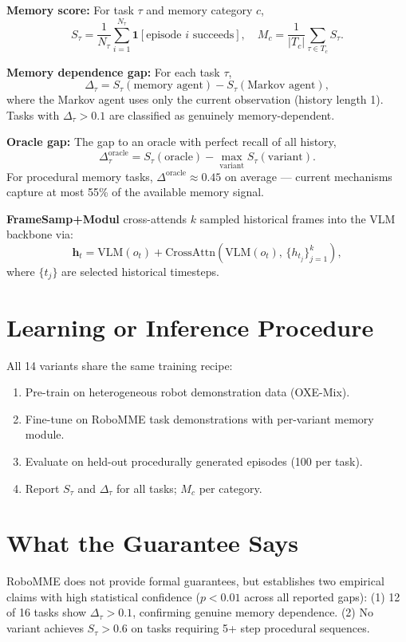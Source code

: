 \documentclass[10pt,twocolumn]{article}
\begin{document}
\textbf{Memory score:} For task $\tau$ and memory category $c$,
\[
S_\tau = \frac{1}{N_\tau}\sum_{i=1}^{N_\tau} \mathbf{1}[\text{episode } i \text{ succeeds}], \quad
M_c = \frac{1}{|T_c|}\sum_{\tau \in T_c} S_\tau.
\]

\textbf{Memory dependence gap:} For each task $\tau$,
\[
\Delta_\tau = S_\tau(\text{memory agent}) - S_\tau(\text{Markov agent}),
\]
where the Markov agent uses only the current observation (history length 1).
Tasks with $\Delta_\tau > 0.1$ are classified as genuinely memory-dependent.

\textbf{Oracle gap:} The gap to an oracle with perfect recall of all history,
\[
\Delta^\text{oracle}_\tau = S_\tau(\text{oracle}) - \max_\text{variant} S_\tau(\text{variant}).
\]
For procedural memory tasks, $\Delta^\text{oracle} \approx 0.45$ on average ---
current mechanisms capture at most 55\% of the available memory signal.

\textbf{FrameSamp+Modul} cross-attends $k$ sampled historical frames into the
VLM backbone via:
\[
\mathbf{h}_t = \text{VLM}(o_t) + \text{CrossAttn}(\text{VLM}(o_t),\,\{h_{t_j}\}_{j=1}^k),
\]
where $\{t_j\}$ are selected historical timesteps.

\section{Learning or Inference Procedure}

All 14 variants share the same training recipe:
\begin{enumerate}[itemsep=2pt,parsep=0pt]
  \item Pre-train on heterogeneous robot demonstration data (OXE-Mix).
  \item Fine-tune on RoboMME task demonstrations with per-variant
    memory module.
  \item Evaluate on held-out procedurally generated episodes (100 per task).
  \item Report $S_\tau$ and $\Delta_\tau$ for all tasks; $M_c$ per category.
\end{enumerate}

\section{What the Guarantee Says}

RoboMME does not provide formal guarantees, but establishes two empirical
claims with high statistical confidence ($p < 0.01$ across all reported gaps):
(1) 12 of 16 tasks show $\Delta_\tau > 0.1$, confirming genuine memory
dependence. (2) No variant achieves $S_\tau > 0.6$ on tasks requiring 5+ step
procedural sequences.
\end{document}
